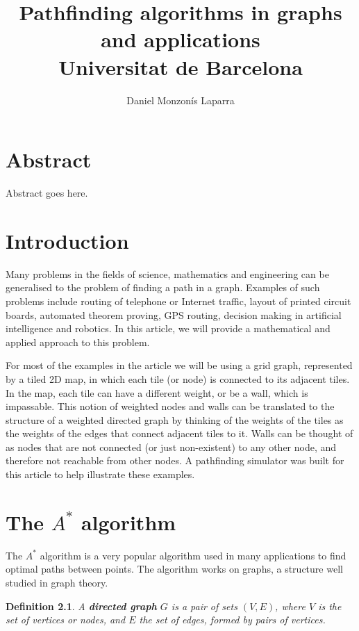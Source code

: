 \documentclass[12pt]{report}
\title{
{Pathfinding algorithms in graphs and applications}\\
{\large Universitat de Barcelona}
}
\author{Daniel Monzonís Laparra}
\newtheorem{definition}[theorem]{Definition}
\begin{document}
\maketitle

\chapter*{Abstract}
Abstract goes here.

\tableofcontents

\chapter{Introduction}
Many problems in the fields of science, mathematics and engineering can be generalised to the problem of finding a path in a graph. Examples of such problems include routing of telephone or Internet traffic, layout of printed circuit boards, automated theorem proving, GPS routing, decision making in artificial intelligence and robotics. In this article, we will provide a mathematical and applied approach to this problem.

For most of the examples in the article we will be using a grid graph, represented by a tiled 2D map, in which each tile (or node) is connected to its adjacent tiles. In the map, each tile can have a different weight, or be a wall, which is impassable. This notion of weighted nodes and walls can be translated to the structure of a weighted directed graph by thinking of the weights of the tiles as the weights of the edges that connect adjacent tiles to it. Walls can be thought of as nodes that are not connected (or just non-existent) to any other node, and therefore not reachable from other nodes. A pathfinding simulator was built for this article to help illustrate these examples.

\chapter{The $A^*$ algorithm}
The $A^*$ algorithm is a very popular algorithm used in many applications to find optimal paths between points. The algorithm works on graphs, a structure well studied in graph theory.

\begin{definition}
A \textbf{directed graph} $G$ is a pair of sets $(V, E)$, where $V$ is the set of vertices or nodes, and $E$ the set of edges, formed by pairs of vertices.
\end{definition}
\end{document}
